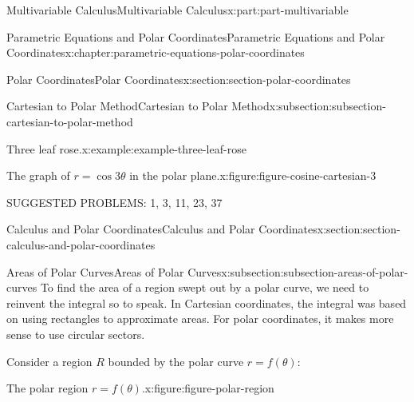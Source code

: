 \documentclass[twoside,10pt,]{book}
\numberwithin{equation}{part}
\begin{document}
\begin{partptx}{Multivariable Calculus}{}{Multivariable Calculus}{}{}{x:part:part-multivariable}
\begin{chapterptx}{Parametric Equations and Polar Coordinates}{}{Parametric Equations and Polar Coordinates}{}{}{x:chapter:parametric-equations-polar-coordinates}
\begin{sectionptx}{Polar Coordinates}{}{Polar Coordinates}{}{}{x:section:section-polar-coordinates}
\begin{subsectionptx}{Cartesian to Polar Method}{}{Cartesian to Polar Method}{}{}{x:subsection:subsection-cartesian-to-polar-method}
\begin{example}{Three leaf rose.}{x:example:example-three-leaf-rose}
\begin{figureptx}{The graph of \(r=\cos3\theta\) in the polar plane.}{x:figure:figure-cosine-cartesian-3}{}
\begin{image}{0}{1}{0}
{
}%
\end{image}%
\tcblower
\end{figureptx}%
\end{example}
SUGGESTED PROBLEMS: 1, 3, 11, 23, 37%
\end{subsectionptx}
\end{sectionptx}
%
%
\typeout{************************************************}
\typeout{************************************************}
%
\begin{sectionptx}{Calculus and Polar Coordinates}{}{Calculus and Polar Coordinates}{}{}{x:section:section-calculus-and-polar-coordinates}
%
%
\typeout{************************************************}
\typeout{************************************************}
%
\begin{subsectionptx}{Areas of Polar Curves}{}{Areas of Polar Curves}{}{}{x:subsection:subsection-areas-of-polar-curves}
To find the area of a region swept out by a polar curve, we need to reinvent the integral so to speak. In Cartesian coordinates, the integral was based on using rectangles to approximate areas. For polar coordinates, it makes more sense to use circular sectors.%
\par
Consider a region \(R\) bounded by the polar curve \(r = f(\theta)\):%
\begin{figureptx}{The polar region \(r = f(\theta)\).}{x:figure:figure-polar-region}{}%
\begin{image}{0}{1}{0}%
\end{image}
\end{figureptx}
\end{subsectionptx}
\end{sectionptx}
\end{chapterptx}
\end{partptx}
\end{document}

